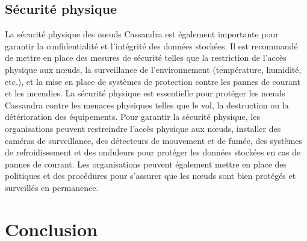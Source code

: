 \documentclass[12pt, letterpaper]{report}
\begin{document}
\section{Sécurité physique}
La sécurité physique des nœuds Cassandra est également importante pour garantir la confidentialité et l'intégrité des données stockées. Il est recommandé de mettre en place des mesures de sécurité telles que la restriction de l'accès physique aux nœuds, la surveillance de l'environnement (température, humidité, etc.), et la mise en place de systèmes de protection contre les pannes de courant et les incendies.
\newline
La sécurité physique est essentielle pour protéger les nœuds Cassandra contre les menaces physiques telles que le vol, la destruction ou la détérioration des équipements. Pour garantir la sécurité physique, les organisations peuvent restreindre l'accès physique aux nœuds, installer des caméras de surveillance, des détecteurs de mouvement et de fumée, des systèmes de refroidissement et des onduleurs pour protéger les données stockées en cas de pannes de courant. Les organisations peuvent également mettre en place des politiques et des procédures pour s'assurer que les nœuds sont bien protégés et surveillés en permanence.

\chapter{Conclusion}
\end{document}

